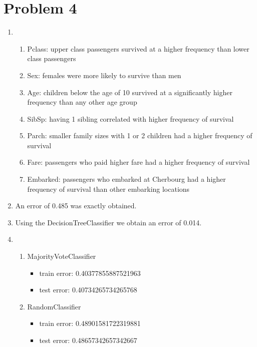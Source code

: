 \documentclass[11pt]{article}
\begin{document}
\section{Problem 4}
    \begin{enumerate}
    
        \item
            \begin{enumerate}
                \item Pclass: upper class passengers survived at a higher frequency than lower class passengers
                \item Sex: females were more likely to survive than men
                \item Age: children below the age of 10 survived at a significantly higher frequency than any other age group
                \item SibSp: having 1 sibling correlated with higher frequency of survival
                \item Parch: smaller family sizes with 1 or 2 children had a higher frequency of survival
                \item Fare: passengers who paid higher fare had a higher frequency of survival
                \item Embarked: passengers who embarked at Cherbourg had a higher frequency of survival than other embarking locations
            \end{enumerate}
        
        \item An error of 0.485 was exactly obtained.
        \item Using the DecisionTreeClassifier we obtain an error of 0.014.
        \item 
        \begin{enumerate}
            \item MajorityVoteClassifier
                \begin{itemize}
                    \item train error: 0.40377855887521963
                    \item test error: 0.40734265734265768
                \end{itemize}

            \item RandomClassifier
                \begin{itemize}
                    \item train error: 0.48901581722319881
                    \item test error: 0.48657342657342667
                \end{itemize}
            


\end{enumerate}
\end{enumerate}
\end{document}
